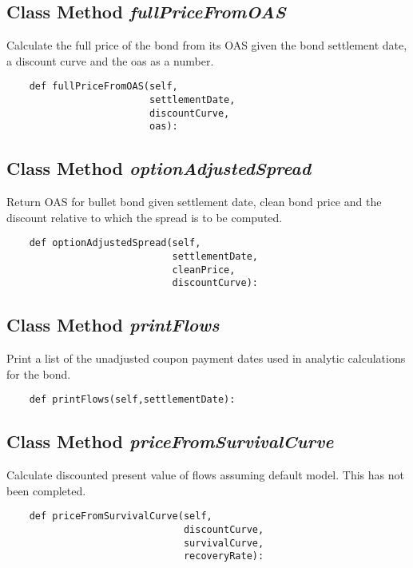 \documentclass[twoside,11pt]{book}
\begin{document}
\subsection{Class Method {\it fullPriceFromOAS}}
Calculate the full price of the bond from its OAS given the bond settlement date, a discount curve and the oas as a number. 

\begin{lstlisting}
    def fullPriceFromOAS(self, 
                         settlementDate, 
                         discountCurve, 
                         oas):
\end{lstlisting}

\subsection{Class Method {\it optionAdjustedSpread}}
Return OAS for bullet bond given settlement date, clean bond price and the discount relative to which the spread is to be computed. 

\begin{lstlisting}
    def optionAdjustedSpread(self, 
                             settlementDate, 
                             cleanPrice, 
                             discountCurve):
\end{lstlisting}

\subsection{Class Method {\it printFlows}}
Print a list of the unadjusted coupon payment dates used in analytic calculations for the bond. 

\begin{lstlisting}
    def printFlows(self,settlementDate):
\end{lstlisting}

\subsection{Class Method {\it priceFromSurvivalCurve}}
Calculate discounted present value of flows assuming default model. This has not been completed. 

\begin{lstlisting}
    def priceFromSurvivalCurve(self, 
                               discountCurve, 
                               survivalCurve, 
                               recoveryRate):
\end{lstlisting}
\end{document}
